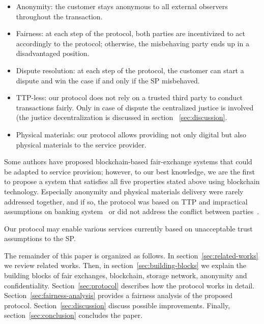 \documentclass{ieeeaccess}
\begin{document}
\begin{itemize}
\item Anonymity: the customer stays anonymous to all external observers throughout the transaction.
\item Fairness:
at each step of the protocol, both parties are incentivized to act accordingly to the protocol; otherwise, the misbehaving party ends up in a disadvantaged position.
\item Dispute resolution: at each step of the protocol, the customer can start a dispute and win the case if and only if the SP misbehaved.

\item TTP-less: 
our protocol does not rely on a trusted third party to conduct transactions fairly. Only in case of dispute the centralized justice is involved (the justice decentralization is discussed in section ~\ref{sec:discussion}.
\item Physical materials: our protocol allows providing not only digital but also physical materials to the service provider.
\end{itemize} 

Some authors have proposed blockchain-based fair-exchange systems that could be adapted to service provision; however, to our best knowledge, we are the first to propose a system that satisfies all five properties stated above using blockchain technology. Especially anonymity and physical materials delivery were rarely addressed together, and if so, the protocol was based on TTP and impractical assumptions on banking system~\cite{birjoveanuAnonymityFairexchangeEcommerce2015} or did not address the conflict
between parties~\cite{altawyLelantosBlockchainBasedAnonymous2017}.

Our protocol may enable various services currently based on unacceptable trust assumptions to the SP.

The remainder of this paper is organized as follows.
In section~\ref{sec:related-works} we review related works. 
Then, in section~\ref{sec:building-blocks} we explain the building blocks of fair exchanges, blockchain, storage network, anonymity and confidentiality.
Section~\ref{sec:protocol} describes how the protocol works in detail.
Section~\ref{sec:fairness-analysis} provides a fairness analysis of the proposed protocol.
Section~\ref{sec:discussion} discuss possible improvements. 
Finally, section~\ref{sec:conclusion} concludes the paper.
\end{document}
